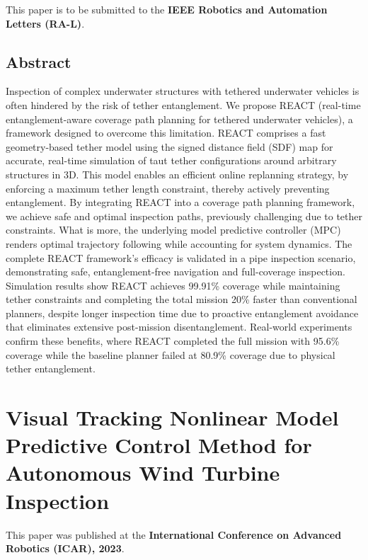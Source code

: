 \documentclass[
10pt, %
b5paper, %
twoside, %
openright  %
]{book}  %
\begin{document}
This paper is to be submitted to the \textbf{IEEE Robotics and Automation Letters (RA-L)}.


 \section{Abstract}
 Inspection of complex underwater structures with tethered underwater vehicles is often hindered by the risk of tether entanglement. We propose REACT (real-time entanglement-aware coverage path planning for tethered underwater vehicles), a framework designed to overcome this limitation. REACT comprises a fast geometry-based tether model using the signed distance field (SDF) map for accurate, real-time simulation of taut tether configurations around arbitrary structures in 3D. This model enables an efficient online replanning strategy, by enforcing a maximum tether length constraint, thereby actively preventing entanglement. By integrating REACT into a coverage path planning framework, we achieve safe and optimal inspection paths, previously challenging due to tether constraints. What is more, the underlying model predictive controller (MPC) renders optimal trajectory following while accounting for system dynamics. The complete REACT framework's efficacy is validated in a pipe inspection scenario, demonstrating safe, entanglement-free navigation and full-coverage inspection. Simulation results show REACT achieves 99.91\% coverage while maintaining tether constraints and completing the total mission 20\% faster than conventional planners, despite longer inspection time due to proactive entanglement avoidance that eliminates extensive post-mission disentanglement. Real-world experiments confirm these benefits, where REACT completed the full mission with 95.6\% coverage while the baseline planner failed at 80.9\% coverage due to physical tether entanglement.


 \newpage
 



\chapter{Visual Tracking Nonlinear Model Predictive Control Method for
Autonomous Wind Turbine Inspection}
\vspace{1cm}
This paper was published at the \textbf{International Conference on Advanced Robotics (ICAR), 2023}.
\end{document}

